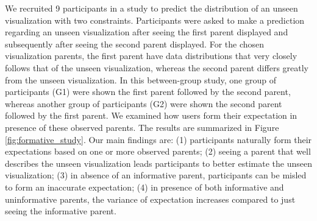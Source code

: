 We recruited 9 participants in a study to predict the distribution of an unseen visualization with two constraints. Participants were asked to make a prediction regarding an unseen visualization after seeing the first parent displayed and subsequently after seeing the second parent displayed. For the chosen visualization parents, the first parent have data distributions that very closely follows that of the unseen visualization, whereas the second parent differs greatly from the unseen visualization. In this between-group study, one group of participants (G1) were shown the first parent followed by the second parent, whereas another group of participants (G2) were shown the second parent followed by the first parent. We examined how users form their expectation in presence of these observed parents. The results are summarized in Figure \ref{fig:formative_study}. Our main findings are: (1) participants naturally form their expectations based on one or more observed parents; (2) seeing a parent that well describes the unseen visualization leads participants to better estimate the unseen visualization; (3) in absence of an informative parent, participants can be misled to form an inaccurate expectation; (4) in presence of  both informative and uninformative parents, the variance of expectation increases compared to just seeing the informative parent.

